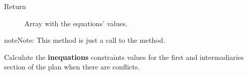 \documentclass[letterpaper,10pt,english]{sphinxmanual}
\begin{document}
\begin{fulllineitems}
\begin{fulllineitems}
\begin{description}
\item[{Return}] \leavevmode
Array with the equations' values.

\end{description}

\begin{notice}{note}{Note:}
This method is just a call to the {\hyperref[Multi-robot motion planner:planning_sim.Robot._sa_feqcons]{}} method.
\end{notice}

\end{fulllineitems}


\begin{fulllineitems}
\label{Multi-robot motion planner:planning_sim.Robot._co_fieqcons}
Calculate the \textbf{inequations} constraints values for the first and intermadiaries
section of the plan when there are conflicts.


\end{fulllineitems}
\end{fulllineitems}
\end{document}
